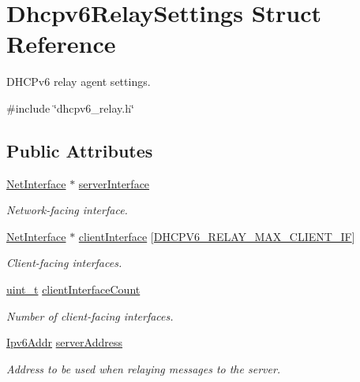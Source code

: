\hypertarget{structDhcpv6RelaySettings}{}\section{Dhcpv6\+Relay\+Settings Struct Reference}
\label{structDhcpv6RelaySettings}


D\+H\+C\+Pv6 relay agent settings.  




{\ttfamily \#include \char`\"{}dhcpv6\+\_\+relay.\+h\char`\"{}}

\subsection*{Public Attributes}
\begin{DoxyCompactItemize}
\item 
\hyperlink{net_8h_a2234db8911a1148c9159979d8f5e0d6b}{Net\+Interface} $\ast$ \hyperlink{structDhcpv6RelaySettings_afa82c181218d1b3adefa0df21eba2f4e}{server\+Interface}
\begin{DoxyCompactList}\small\item\em Network-\/facing interface. \end{DoxyCompactList}\item 
\hyperlink{net_8h_a2234db8911a1148c9159979d8f5e0d6b}{Net\+Interface} $\ast$ \hyperlink{structDhcpv6RelaySettings_a4241ac47ff555d8eec259b14eb51e3b9}{client\+Interface} \mbox{[}\hyperlink{dhcpv6__relay_8h_a588f9db9b4638a3b196e1421ab1bf6dc}{D\+H\+C\+P\+V6\+\_\+\+R\+E\+L\+A\+Y\+\_\+\+M\+A\+X\+\_\+\+C\+L\+I\+E\+N\+T\+\_\+\+IF}\mbox{]}
\begin{DoxyCompactList}\small\item\em Client-\/facing interfaces. \end{DoxyCompactList}\item 
\hyperlink{compiler__port_8h_a12a1e9b3ce141648783a82445d02b58d}{uint\+\_\+t} \hyperlink{structDhcpv6RelaySettings_a71332729d2fd110fdb43069bbe8675b5}{client\+Interface\+Count}
\begin{DoxyCompactList}\small\item\em Number of client-\/facing interfaces. \end{DoxyCompactList}\item 
\hyperlink{ipv6_8h_aed0cbc40c61ed5b4fb681ebc55237e89}{Ipv6\+Addr} \hyperlink{structDhcpv6RelaySettings_a67c3bcbd5fc280fe4bbff6e074ae4d8b}{server\+Address}
\begin{DoxyCompactList}\small\item\em Address to be used when relaying messages to the server. \end{DoxyCompactList}\end{DoxyCompactItemize}


